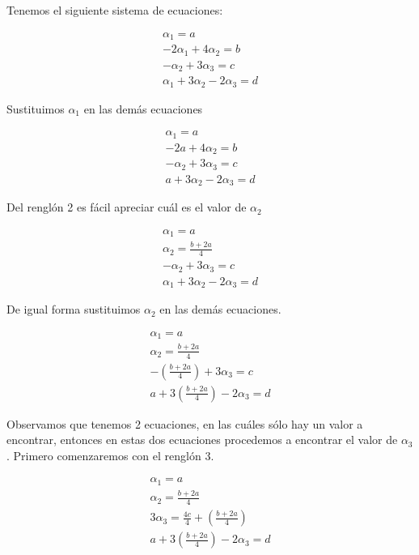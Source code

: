 \documentclass[letterpaper]{article}
\renewcommand{\*}{\cdot}
\theoremstyle{definition}
\begin{document}
Tenemos el siguiente sistema de ecuaciones:
\begin{center}
	\begin{align*}
	\alpha_{1}=a\\
	-2\alpha_{1}+4\alpha_{2}=b\\
	-\alpha_{2}+3\alpha_{3}=c\\
	\alpha_{1}+3\alpha_{2}-2\alpha_{3}=d
	\end{align*}
\end{center}
Sustituimos $\alpha_{1}$ en las demás ecuaciones
\begin{center}
	\begin{align*}
	\alpha_{1}=a\\
	-2a+4\alpha_{2}=b\\
	-\alpha_{2}+3\alpha_{3}=c\\
	a+3\alpha_{2}-2\alpha_{3}=d
	\end{align*}
\end{center}
Del renglón 2 es fácil apreciar cuál es el valor de $\alpha_{2}$
\begin{center}
	\begin{align*}
	\alpha_{1}=a\\
	\alpha_{2}=\frac{b+2a}{4}\\
	-\alpha_{2}+3\alpha_{3}=c\\
	\alpha_{1}+3\alpha_{2}-2\alpha_{3}=d
	\end{align*}
\end{center}
De igual forma sustituimos $\alpha_{2}$ en las demás ecuaciones.
\begin{center}
	\begin{align*}
	\alpha_{1}=a\\
	\alpha_{2}=\frac{b+2a}{4}\\
	-(\frac{b+2a}{4})+3\alpha_{3}=c\\
	a+3(\frac{b+2a}{4})-2\alpha_{3}=d
	\end{align*}
\end{center}
Observamos que tenemos 2 ecuaciones, en las cuáles sólo hay un valor a encontrar, entonces en estas dos ecuaciones procedemos a encontrar el valor de $\alpha_{3}$. Primero comenzaremos con el renglón 3.
\begin{center}
	\begin{align*}
	\alpha_{1}=a\\
	\alpha_{2}=\frac{b+2a}{4}\\
	3\alpha_{3}=\frac{4c}{4}+(\frac{b+2a}{4})\\
	a+3(\frac{b+2a}{4})-2\alpha_{3}=d
	\end{align*}
\end{center}
\end{document}
